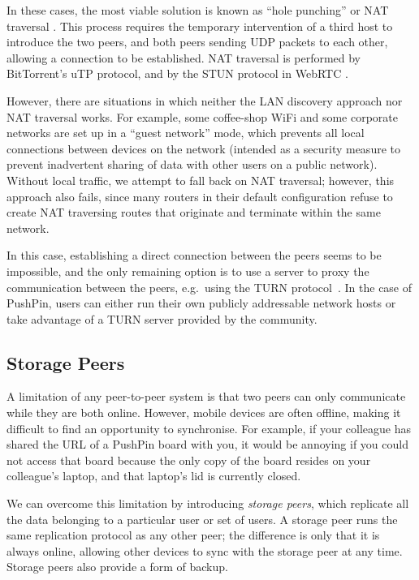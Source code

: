 \documentclass[sigplan,10pt]{acmart}
\begin{document}
In these cases, the most viable solution is known as ``hole punching'' or NAT traversal \cite{RFC5389}.
This process requires the temporary intervention of a third host to introduce the two peers, and both peers sending UDP packets to each other, allowing a connection to be established.
NAT traversal is performed by BitTorrent's uTP protocol, and by the STUN protocol in WebRTC \cite{RFC5389}.

However, there are situations in which neither the LAN discovery approach nor NAT traversal works.
For example, some coffee-shop WiFi and some corporate networks are set up in a ``guest network'' mode, which prevents all local connections between devices on the network (intended as a security measure to prevent inadvertent sharing of data with other users on a public network).
Without local traffic, we attempt to fall back on NAT traversal; however, this approach also fails, since many routers in their default configuration refuse to create NAT traversing routes that originate and terminate within the same network.

In this case, establishing a direct connection between the peers seems to be impossible, and the only remaining option is to use a server to proxy the communication between the peers, e.g.\ using the TURN protocol~\cite{RFC5766}.
In the case of PushPin, users can either run their own publicly addressable network hosts or take advantage of a TURN server provided by the community.

\subsection{Storage Peers}

A limitation of any peer-to-peer system is that two peers can only communicate while they are both online.
However, mobile devices are often offline, making it difficult to find an opportunity to synchronise.
For example, if your colleague has shared the URL of a PushPin board with you, it would be annoying if you could not access that board because the only copy of the board resides on your colleague's laptop, and that laptop's lid is currently closed.

We can overcome this limitation by introducing \emph{storage peers}, which replicate all the data belonging to a particular user or set of users.
A storage peer runs the same replication protocol as any other peer; the difference is only that it is always online, allowing other devices to sync with the storage peer at any time.
Storage peers also provide a form of backup.
\end{document}
